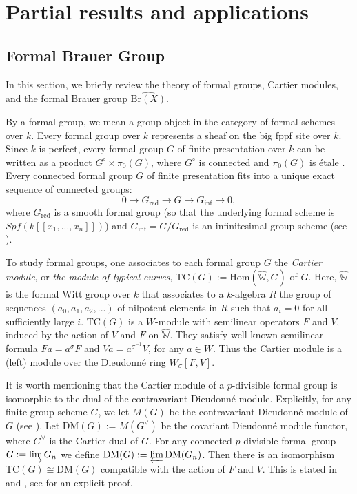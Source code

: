 \documentclass[a4paper,12pt,twoside]{report}
\newcommand{\Br}{\mathrm{Br}}
\newcommand{\Hom}{\mathrm{Hom}}
\newcommand{\TC}{\mathrm{TC}}
\newcommand{\DM}{\mathrm{DM}}
\newcommand{\red}{\mathrm{red}}
\newcommand{\W}{\mathbb{W}}
\begin{document}
\chapter{Partial results and applications} \label{Chap6}

\section{Formal Brauer Group}\label{formalBrauer}
\medskip

In this section, we briefly review the theory of formal groups, Cartier modules, 
and the formal Brauer group $\widehat{\Br(X)}$. 

By a formal group, we mean a group object in the category of formal schemes over $k$. 
Every formal group over $k$ represents a sheaf on the big fppf site over $k$. 
Since $k$ is perfect, every formal group $G$ of finite presentation over $k$ can be written as a product $G^\circ\times \pi_0(G)$, 
where $G^{\circ}$ is connected and $\pi_0(G)$ is \'etale \cite[II.7, p. 34]{De}. 
Every connected formal group $G$ of finite presentation
fits into a unique exact sequence of connected groups: 
\[0\rightarrow G_{\red} \rightarrow G \rightarrow G_{\inf} \rightarrow 0,\]
where $G_{\red}$ is a smooth formal group (so that 
the underlying formal scheme is $Spf(k[[x_1,...,x_n]])$) 
and $G_{\inf}=G/G_{\red}$ is an infinitesimal group scheme (see \cite[Section II.10, p. 43]{De}). 

To study formal groups, one associates to each formal group $G$ the \emph{Cartier module}, 
or \emph{the module of typical curves}, $\TC(G):=\Hom(\widehat{\W},G)$ of $G$. 
Here, $\widehat{\W}$ is the formal Witt group over $k$ that associates to a $k$-algebra $R$ 
the group of sequences $(a_0,a_1,a_2,...)$ of nilpotent elements in $R$ such that $a_i=0$ for all  sufficiently large $i$. 
$\TC(G)$ is a $W$-module with semilinear operators $F$ and $V$, induced by the action of $V$ and $F$ on $\widehat{\W}$. 
They satisfy well-known semilinear formula $Fa=a^{\sigma}F$ and $Va=a^{\sigma^{-1}}V$, for any $a\in W$. 
Thus the Cartier module is a (left) module over the Dieudonn\'e ring $W_{\sigma}[F,V]$.  

It is worth mentioning that the Cartier module of a $p$-divisible formal group is isomorphic 
to the dual of the contravariant Dieudonn\'e module. 
Explicitly, for any finite group scheme $G$, 
we let $M(G)$ be the contravariant Dieudonn\'e module of $G$ (see \cite[Chapter III]{De}).
Let $\DM(G):=M(G^{\vee})$ be the covariant Dieudonn\'e module functor, 
where $G^\vee$ is the Cartier dual of $G$. 
For any connected $p$-divisible formal group $G:=\varinjlim G_n$
we define $\DM(G):=\varprojlim \DM(G_n)$.
Then there is an isomorphism $\TC(G)\cong \DM(G)$ compatible with the action of $F$ and $V$. 
This is stated in \cite[Section I.3, p.~102]{AM} and \cite[Remark 3.3]{Br}, 
see \cite{Mo} for an explicit proof. 
\end{document}
